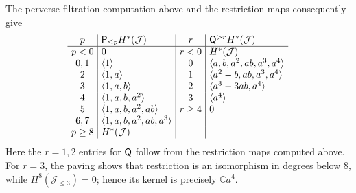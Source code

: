 \documentclass[a4paper,11pt,leqno]{amsart}
\begin{document}
\begin{ex}
The perverse filtration computation above and the restriction maps consequently give
\[
\setlength{\arraycolsep}{4pt}
\begin{array}{c|l|c|l}
p & \mathsf{P}_{\le p}H^*(\J)
& r & \mathsf{Q}^{>r}H^*(\J)\\ \hline
p<0 & 0
& r<0 & H^*(\J)\\
0,1 & \langle1\rangle
& 0 & \langle a,b,a^2,ab,a^3,a^4\rangle\\
2 & \langle1,a\rangle
& 1 & \langle a^2-b,ab,a^3,a^4\rangle\\
3 & \langle1,a,b\rangle
& 2 & \langle a^3-3ab,a^4\rangle\\
4 & \langle1,a,b,a^2\rangle
& 3 & \langle a^4\rangle\\
5 & \langle1,a,b,a^2,ab\rangle
& r\ge4 & 0\\
6,7 & \langle1,a,b,a^2,ab,a^3\rangle
& & \\
p\ge8 & H^*(\J)
& &
\end{array}
\]
Here the \(r=1,2\) entries for $\sf{Q}$ follow from the restriction maps computed above. For \(r=3\), the paving shows that restriction is an isomorphism in degrees below \(8\), while \(H^8(\mathcal J_{\le3})=0\); hence its kernel is precisely \(\mathbb C a^4\).


\end{ex}
\end{document}
